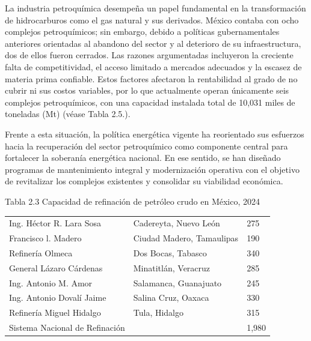 \documentclass{sener2025}
\begin{document}

La industria petroquímica desempeña un papel fundamental en la transformación de hidrocarburos como el gas natural y sus derivados. México contaba con ocho complejos petroquímicos; sin embargo, debido a políticas gubernamentales anteriores orientadas al abandono del sector y al deterioro de su infraestructura, dos de ellos fueron cerrados. Las razones argumentadas incluyeron la creciente falta de competitividad, el acceso limitado a mercados adecuados y la escasez de materia prima confiable. Estos factores afectaron la rentabilidad al grado de no cubrir ni sus costos variables, por lo que actualmente operan únicamente seis complejos petroquímicos, con una capacidad instalada total de 10,031 miles de toneladas (Mt) (véase Tabla 2.5.).


Frente a esta situación, la política energética vigente ha reorientado sus esfuerzos hacia la recuperación del sector petroquímico como componente central para fortalecer la soberanía energética nacional. En ese sentido, se han diseñado programas de mantenimiento integral y modernización operativa con el objetivo de revitalizar los complejos existentes y consolidar su viabilidad económica.

\begin{tabladoradoCorto}
  \caption{Tabla 2.3 Capacidad de refinación de petróleo crudo en México, 2024}
  \label{tab:tabla_2_3_capacidad_de_refinac}
  \begin{tabularx}{\textwidth}{Vvv}
    \toprule
      &  &  \\
    \midrule
    Ing. Héctor R. Lara Sosa & Cadereyta, Nuevo León & 275 \\
    Francisco l. Madero & Ciudad Madero, Tamaulipas & 190 \\
    Refinería Olmeca & Dos Bocas, Tabasco & 340 \\
    General Lázaro Cárdenas & Minatitlán, Veracruz & 285 \\
    Ing. Antonio M. Amor & Salamanca, Guanajuato & 245 \\
    Ing. Antonio Dovalí Jaime & Salina Cruz, Oaxaca & 330 \\
    Refinería Miguel Hidalgo & Tula, Hidalgo & 315 \\
    Sistema Nacional de Refinación &  & 1,980 \\
    \bottomrule
  \end{tabularx}
\end{tabladoradoCorto}
\vspace{-4pt}
\end{document}
